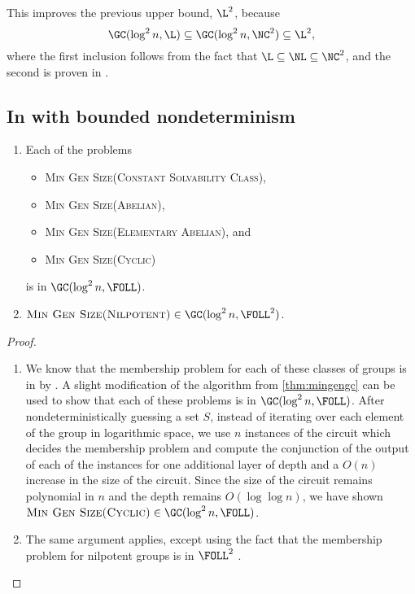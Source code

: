 \documentclass{article}
\begin{document}
This improves the previous upper bound, $\L^2$, because
\begin{equation*}
  \GC(\log^2 n, \L) \subseteq \GC(\log^2 n, \NC^2) \subseteq \L^2,
\end{equation*}
where the first inclusion follows from the fact that $\L \subseteq \NL \subseteq \NC^2$, and the second is proven in \cite[Lemma~3.2.8]{wolf90}.

\subsection{In \texorpdfstring{\FOLL}{FOLL} with bounded nondeterminism}

\begin{theorem}
  \mbox{}
  \begin{enumerate}
  \item Each of the problems
    \begin{itemize}
    \item \textsc{Min Gen Size(Constant Solvability Class)},
    \item \textsc{Min Gen Size(Abelian)},
    \item \textsc{Min Gen Size(Elementary Abelian)}, and
    \item \textsc{Min Gen Size(Cyclic)}
    \end{itemize}
    is in $\GC(\log^2 n, \FOLL)$.
  \item $\textsc{Min Gen Size(Nilpotent)} \in \GC(\log^2 n, \FOLL^2)$.
  \end{enumerate}
\end{theorem}
\begin{proof}
  \mbox{}
  \begin{enumerate}
  \item
    We know that the membership problem for each of these classes of groups is in \FOLL{} by \cite[Section~3]{bklm01}.
    A slight modification of the algorithm from \autoref{thm:mingengc} can be used to show that each of these problems is in $\GC(\log^2 n, \FOLL)$.
    After nondeterministically guessing a set $S$, instead of iterating over each element of the group in logarithmic space, we use $n$ instances of the \FOLL{} circuit which decides the membership problem and compute the conjunction of the output of each of the instances for one additional layer of depth and a $O(n)$ increase in the size of the circuit.
    Since the size of the circuit remains polynomial in $n$ and the depth remains $O(\log \log n)$, we have shown $\textsc{Min Gen Size(Cyclic)} \in \GC(\log^2 n, \FOLL)$.
  \item The same argument applies, except using the fact that the membership problem for nilpotent groups is in $\FOLL^2$ \cite[Corollary~3.12]{bklm01}. \qedhere
  \end{enumerate}
\end{proof}
\end{document}
